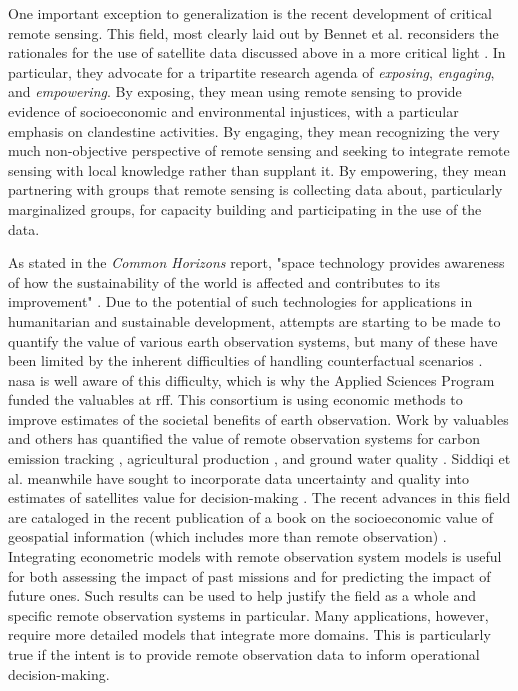 One important exception to generalization is the recent development of critical remote sensing. This field, most clearly laid out by Bennet et al. reconsiders the rationales for the use of satellite data discussed above in a more critical light \cite{bennettPoliticsPixelsReview2022}. In particular, they advocate for a tripartite research agenda of \textit{exposing}, \textit{engaging}, and \textit{empowering}. By exposing, they mean using remote sensing to provide evidence of socioeconomic and environmental injustices, with a particular emphasis on clandestine activities. By engaging, they mean recognizing the very much non-objective perspective of remote sensing and seeking to integrate remote sensing with local knowledge rather than supplant it. By empowering, they mean partnering with groups that remote sensing is collecting data about, particularly marginalized groups, for capacity building and participating in the use of the data.

As stated in the \textit{Common Horizons} report, "space technology provides awareness of how the sustainability of the world is affected and contributes to its improvement" \cite{southernhemispheresummerspaceprogram2013CommonHorizonsWhite2013}. Due to the potential of such technologies for applications in humanitarian and sustainable development, attempts are starting to be made to quantify the value of various earth observation systems, but many of these have been limited by the inherent difficulties of handling counterfactual scenarios \cite{macauleyValueInformationMeasuring2006}. \ac{nasa} is well aware of this difficulty, which is why the Applied Sciences Program funded the \ac{valuables} at \ac{rff}. This consortium is using economic methods to improve estimates of the societal benefits of earth observation. Work by \ac{valuables} and others has quantified the value of remote observation systems for carbon emission tracking \cite{cookeUsingSocialCost2016}, agricultural production \cite{forneyEconomicValueRemoteSensing2012}, and ground water quality \cite{forneyEconomicValueRemoteSensing2012}. Siddiqi et al. meanwhile have sought to incorporate data uncertainty and quality into estimates of satellites value for decision-making \cite{siddiqiIntegratingGloballyDispersed2020, siddiqiValuingRadiometricQuality2021}. The recent advances in this field are cataloged in the recent publication of a book on the socioeconomic value of geospatial information (which includes more than remote observation) \cite{kruseGEOValueSocioeconomicValue2017}. Integrating econometric models with remote observation system models is useful for both assessing the impact of past missions and for predicting the impact of future ones. Such results can be used to help justify the field as a whole and specific remote observation systems in particular. Many applications, however, require more detailed models that integrate more domains. This is particularly true if the intent is to provide remote observation data to inform operational decision-making.


